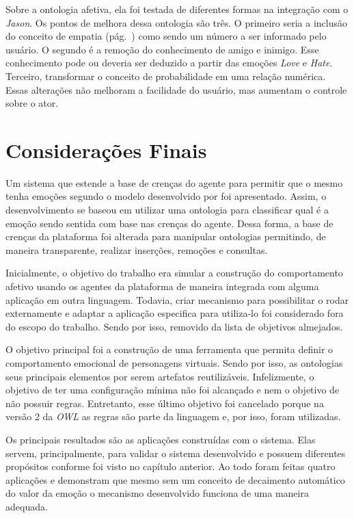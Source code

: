 Sobre a ontologia afetiva, ela foi testada de diferentes formas na integração
com o \emph{Jason}.
Os pontos de melhora dessa
ontologia são três. O primeiro seria a inclusão do conceito de empatia
(pág.~\pageref{mark:empat}) como sendo um número a ser informado pelo usuário.
O segundo é a remoção do conhecimento de amigo e inimigo. Esse conhecimento
pode ou deveria ser deduzido a partir das emoções \emph{Love} e \emph{Hate}.
Terceiro, transformar o conceito de probabilidade em uma relação numérica.
Essas alterações não melhoram a facilidade do usuário, mas aumentam o controle
sobre o ator.

\section{Considerações Finais}

Um sistema que estende a base de crenças do agente \jason para permitir que o
mesmo tenha emoções segundo o modelo desenvolvido por \citet{ortony1988cse}
foi apresentado. Assim, o desenvolvimento se baseou em utilizar uma ontologia
para classificar qual é a emoção sendo sentida com base nas crenças do agente.
Dessa forma, a base de crenças da plataforma foi alterada para manipular
ontologias permitindo, de maneira transparente, realizar inserções, remoções e
consultas.

Inicialmente, o objetivo do trabalho era simular a construção do comportamento
afetivo usando os agentes da plataforma \jason de maneira integrada com alguma
aplicação em outra linguagem. Todavia, criar mecanismo para possibilitar o
\jason rodar externamente e adaptar a aplicação especifica para utiliza-lo foi
considerado fora do escopo do trabalho. Sendo por isso, removido da lista de
objetivos almejados.

O objetivo principal foi a construção de uma ferramenta que permita definir o
comportamento emocional de personagens virtuais. Sendo por isso, as ontologias
seus principais elementos por serem artefatos reutilizáveis. Infelizmente, o
objetivo de ter uma configuração mínima não foi alcançado e nem o objetivo de
não possuir regras. Entretanto, esse último objetivo foi cancelado
porque na versão 2 da \emph{OWL} as regras são parte da linguagem
e, por isso, foram utilizadas.

Os principais resultados são as aplicações construídas com o sistema. Elas
servem, principalmente, para validar o sistema desenvolvido e possuem
diferentes propósitos conforme foi visto no capítulo anterior. Ao todo foram
feitas quatro aplicações e demonstram que mesmo sem um conceito de decaimento
automático do valor da emoção o mecanismo desenvolvido funciona de uma maneira
adequada.

